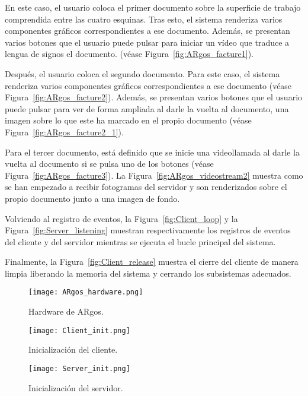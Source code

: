 En este caso, el usuario coloca el primer documento sobre la superficie de trabajo comprendida entre
las cuatro esquinas. Tras esto, el sistema renderiza varios componentes gráficos correspondientes a
ese documento. Además, se presentan varios botones que el usuario puede pulsar para iniciar un vídeo
que traduce a lengua de signos el documento. (véase Figura~\ref{fig:ARgos_facture1}).

Después, el usuario coloca el segundo documento. Para este caso, el sistema renderiza varios
componentes gráficos correspondientes a ese documento (véase
Figura~\ref{fig:ARgos_facture2}). Además, se presentan varios botones que el usuario puede pulsar
para ver de forma ampliada al darle la vuelta al documento, una imagen sobre lo que este ha marcado
en el propio documento (véase Figura~\ref{fig:ARgos_facture2_1}).

Para el tercer documento, está definido que se inicie una videollamada al darle la vuelta al
documento si se pulsa uno de los botones (véase Figura~\ref{fig:ARgos_facture3}). La
Figura~\ref{fig:ARgos_videostream2} muestra como se han empezado a recibir fotogramas del servidor y
son renderizados sobre el propio documento junto a una imagen de fondo.

Volviendo al registro de eventos, la Figura~\ref{fig:Client_loop} y la
Figura~\ref{fig:Server_listening} muestran respectivamente los registros de eventos del cliente y
del servidor mientras se ejecuta el bucle principal del sistema.

Finalmente, la Figura~\ref{fig:Client_release} muestra el cierre del cliente de manera limpia
liberando la memoria del sistema y cerrando los subsistemas adecuados.

\begin{figure}[!h]
  \begin{center}
    \texttt{[image: ARgos\_hardware.png]}
    \caption{Hardware de ARgos.}
    \label{fig:ARgos_hardware}
  \end{center}
\end{figure}

\begin{figure}[!h]
  \begin{center}
    \texttt{[image: Client\_init.png]}
    \caption{Inicialización del cliente.}
    \label{fig:Client_init}
  \end{center}
\end{figure}

\begin{figure}[!h]
  \begin{center}
    \texttt{[image: Server\_init.png]}
    \caption{Inicialización del servidor.}
    \label{fig:Server_init}
  \end{center}
\end{figure}

